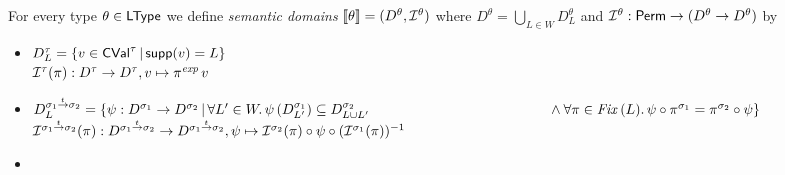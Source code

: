 \documentclass[12pt,a4paper]{report}
\newcommand{\CVal}{\sstyle{CVal}}
\newcommand{\sexp}{\nstyle{exp}}
\newcommand{\I}{\mathcal{I}}
\newcommand{\Fix}[1]{\nstyle{Fix}\,(#1)}
\begin{document}
\begin{definition}
  For every type $\theta\in\mathsf{LType}$ we define {\em semantic domains}
  $\semantic{\theta} = (D^\theta,\I^\theta)$ where
  $D^\theta = \bigcup_{L \in W} D^\theta_L$ and $\I^\theta: \Perm \to (D^\theta \to D^\theta)$ by
  \begin{itemize}
    \item $D^\tau_L = \{v\in\CVal^\tau\,|\,\supp{v} = L\}$ \\
          $\I^\tau(\pi): D^\tau \to D^\tau, v \mapsto \pi^\sexp\,v$
    \item $D^{\ttarrow{\sigma_1}{\sigma_2}}_L = \{\psi: D^{\sigma_1} \to D^{\sigma_2}\,|\,
              \forall L'\in W.\,\psi\,(D^{\sigma_1}_{L'}) \subseteq D^{\sigma_2}_{L \cup L'} \\
              \hspace*{4.5cm} \wedge \forall \pi\in\Fix{L}.\,\psi\circ\pi^{\sigma_1}=\pi^{\sigma_2}\circ\psi\}$\\
          $\I^{\ttarrow{\sigma_1}{\sigma_2}}(\pi):D^{\ttarrow{\sigma_1}{\sigma_2}}\to D^{\ttarrow{\sigma_1}{\sigma_2}},
                              \psi \mapsto \I^{\sigma_2}(\pi) \circ \psi \circ (\I^{\sigma_1}(\pi))^{-1}$
    \item 
  \end{itemize}
\end{definition}
\end{document}
